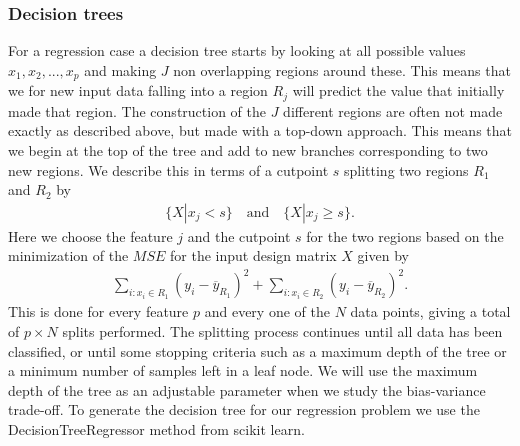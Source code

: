 \documentclass[11pt]{article}
\begin{document}
\subsubsection*{Decision trees}
For a regression case a decision tree starts by looking at all possible values $x_1,x_2,...,x_p$ and making $J$ non overlapping regions around these. This means that we for new input data falling into a region $R_j$ will predict the value that initially made that region. The construction of the $J$ different regions are often not made exactly as described above, but made with a top-down approach. This means that we begin at the top of the tree and add to new branches corresponding to two new regions. We describe this in terms of a cutpoint $s$ splitting two regions $R_1$ and $R_2$ by
\begin{align*}
    \{X|x_j < s\} \quad\text{and}\quad \{X|x_j \geq s\}.
\end{align*}
Here we choose the feature $j$ and the cutpoint $s$ for the two regions based on the minimization of the $MSE$ for the input design matrix $X$ given by
\begin{align*}
    \sum_{i:x_i \in R_1} (y_i - \overline{y}_{R_1})^2  + \sum_{i:x_i \in R_2} (y_i - \overline{y}_{R_2})^2.
\end{align*}
This is done for every feature $p$ and every one of the $N$ data points, giving a total of $p \times N $ splits performed. The splitting process continues until all data has been classified, or until some stopping criteria such as a maximum depth of the tree or a minimum number of samples left in a leaf node. We will use the maximum depth of the tree as an adjustable parameter when we study the bias-variance trade-off. To generate the decision tree for our regression problem we use the DecisionTreeRegressor method from scikit learn.
\end{document}
